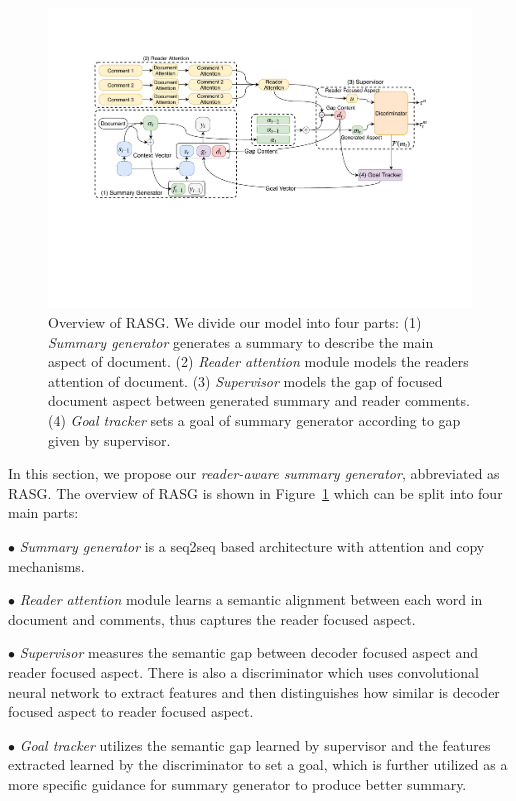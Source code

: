 \documentclass[letterpaper]{article}
\begin{document}
\begin{figure}
    \centering
    \includegraphics[scale=0.66]{figs/weibo.pdf}
    \caption{Overview of RASG. We divide our model into four parts: (1) \textit{Summary generator} generates a summary to describe the main aspect of document. (2) \textit{Reader attention} module models the readers attention of document. (3) \textit{Supervisor} models the gap of focused document aspect between generated summary and reader comments. (4) \textit{Goal tracker} sets a goal of summary generator according to gap given by supervisor.
    }
    \label{fig:overview}
\end{figure}

In this section, we propose our \emph{reader-aware summary generator}, abbreviated as RASG.
The overview of RASG is shown in Figure~\ref{fig:overview} which can be split into four main parts:

$\bullet$ \textit{Summary generator} is a seq2seq based architecture with attention and copy mechanisms.

$\bullet$ \textit{Reader attention} module learns a semantic alignment between each word in document and comments, thus captures the reader focused aspect.

$\bullet$ \textit{Supervisor} measures the semantic gap between decoder focused aspect and reader focused aspect.
There is also a discriminator which uses convolutional neural network to extract features and then distinguishes how similar is decoder focused aspect to reader focused aspect.

$\bullet$ \textit{Goal tracker} utilizes the semantic gap learned by supervisor and the features extracted learned by the discriminator to set a goal, which is further utilized as a more specific guidance for summary generator to produce better summary.
\end{document}
